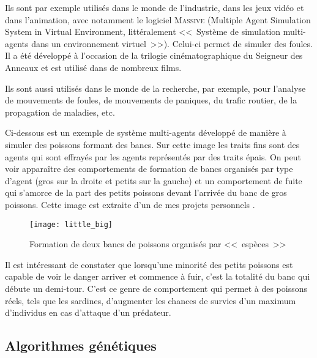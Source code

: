 Ils sont par exemple utilisés dans le monde de l'industrie, dans les jeux vidéo et dans l'animation, avec notamment le logiciel \textsc{Massive} (Multiple Agent Simulation System in Virtual Environment, littéralement <<~Système de simulation multi-agents dans un environnement virtuel~>>).
Celui-ci permet de simuler des foules.
Il a été développé à l'occasion de la trilogie cinématographique du Seigneur des Anneaux et est utilisé dans de nombreux films.

Ils sont aussi utilisés dans le monde de la recherche, par exemple, pour l'analyse de mouvements de foules, de mouvements de paniques, du trafic routier, de la propagation de maladies, etc.

Ci-dessous est un exemple de système multi-agents développé de manière à simuler des poissons formant des bancs.
Sur cette image les traits fins sont des agents qui sont effrayés par les agents représentés par des traits épais.
On peut voir apparaître des comportements de formation de bancs organisés par type d'agent (gros sur la droite et petits sur la gauche) et un comportement de fuite qui s'amorce de la part des petits poissons devant l'arrivée du banc de gros poissons.
Cette image est extraite d'un de mes projets personnels \cite{fish_shoal}.

\FloatBarrier
\begin{figure}[h!]
    \begin{minipage}[c]{0.55\textwidth}
        \begin{center}
            \texttt{[image: little\_big]}
        \end{center}
    \end{minipage}\hfill
    \begin{minipage}[c]{0.45\textwidth}
        \caption{Formation de deux bancs de poissons organisés par <<~espèces~>>}
        \label{figure:shoal}
    \end{minipage}
\end{figure}
\FloatBarrier

Il est intéressant de constater que lorsqu'une minorité des petits poissons est capable de voir le danger arriver et commence à fuir, c'est la totalité du banc qui débute un demi-tour.
C'est ce genre de comportement qui permet à des poissons réels, tels que les sardines, d'augmenter les chances de survies d'un maximum d'individus en cas d'attaque d'un prédateur.

\subsection{Algorithmes génétiques}\label{section:ga}

